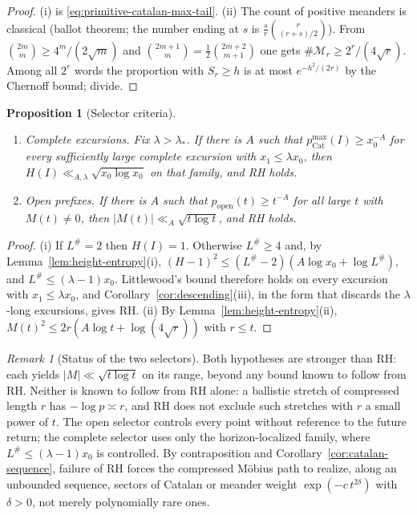 \documentclass[11pt]{amsart}
\numberwithin{equation}{section}
\theoremstyle{plain}
\newtheorem{proposition}[theorem]{Proposition}
\theoremstyle{definition}
\theoremstyle{remark}
\newtheorem{remark}[theorem]{Remark}
\begin{document}
\begin{proof}
(i) is \eqref{eq:primitive-catalan-max-tail}. (ii) The count of positive
meanders is classical (ballot theorem; the number ending at $s$ is
$\frac sr\binom{r}{(r+s)/2}$). From
$\binom{2m}{m}\ge4^m/(2\sqrt m)$ and
$\binom{2m+1}{m}=\frac12\binom{2m+2}{m+1}$ one gets
$\#\mathcal M_r\ge2^r/(4\sqrt r)$. Among all $2^r$ words the proportion with
$S_r\ge h$ is at most $e^{-h^2/(2r)}$ by the Chernoff bound; divide.
\end{proof}

\begin{proposition}[Selector criteria]
\label{prop:selector-criteria}
\begin{enumerate}[label=\textup{(\roman*)}]
\item \emph{Complete excursions.} Fix $\lambda>\lambda_*$. If there is $A$
such that $p^{\max}_{\mathrm{Cat}}(I)\ge x_0^{-A}$ for every sufficiently
large complete excursion with $x_1\le\lambda x_0$, then
$H(I)\ll_{A,\lambda}\sqrt{x_0\log x_0}$ on that family, and RH holds.
\item \emph{Open prefixes.} If there is $A$ such that
$p_{\mathrm{open}}(t)\ge t^{-A}$ for all large $t$ with $M(t)\ne0$, then
$|M(t)|\ll_A\sqrt{t\log t}$, and RH holds.
\end{enumerate}
\end{proposition}

\begin{proof}
(i) If $L^\#=2$ then $H(I)=1$. Otherwise $L^\#\ge4$ and, by
Lemma~\ref{lem:height-entropy}(i), $(H-1)^2\le(L^\#-2)(A\log x_0+\log L^\#)$, and $L^\#\le(\lambda-1)x_0$.
Littlewood's bound therefore holds on every excursion with
$x_1\le\lambda x_0$, and Corollary~\ref{cor:descending}(iii), in the form
that discards the $\lambda$-long excursions, gives RH.
(ii) By Lemma~\ref{lem:height-entropy}(ii),
$M(t)^2\le2r(A\log t+\log(4\sqrt r))$ with $r\le t$.
\end{proof}

\begin{remark}[Status of the two selectors]
\label{rem:selector-status}
Both hypotheses are stronger than RH: each yields $|M|\ll\sqrt{t\log t}$ on
its range, beyond any bound known to follow from RH. Neither is known to follow
from RH alone: a ballistic stretch of compressed length $r$ has $-\log p\asymp r$,
and RH does not exclude such stretches with $r$ a small power of $t$. The open selector controls every point without reference
to the future return; the complete selector uses only the horizon-localized
family, where $L^\#\le(\lambda-1)x_0$ is controlled. By contraposition and
Corollary~\ref{cor:catalan-sequence}, failure of RH forces the compressed
M\"obius path to realize, along an unbounded sequence, sectors of Catalan or
meander weight $\exp(-c\,t^{2\delta})$ with $\delta>0$, not merely
polynomially rare ones.
\end{remark}
\end{document}
